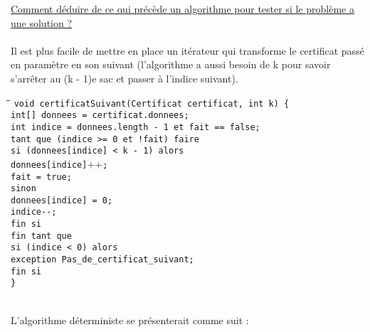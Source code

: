 \underline{Comment déduire de ce qui précède un algorithme pour tester si le problème a une solution ?}
~\\~\\
Il est plus facile de mettre en place un itérateur qui transforme le certificat passé en paramètre en son suivant (l'algorithme a aussi besoin de k pour savoir s'arrêter au (k - 1)e sac et passer
		à l'indice suivant).
\begin{tabbing}
	\hspace{1cm}\=\hspace{1cm}\=\hspace{1cm}\=\kill
	\verb+void certificatSuivant(Certificat certificat, int k) {+\\
		\>\verb+int[] donnees = certificat.donnees;+\\
		\>\verb+int indice = donnees.length - 1 et fait == false;+\\
		\>\verb+tant que (indice >= 0 et !fait) faire+\\
			\>\>\verb+si (donnees[indice] < k - 1) alors+\\
				\>\>\>\verb+donnees[indice]+++\verb+;+\\
				\>\>\>\verb+fait = true;+\\
			\>\>\verb+sinon+\\
				\>\>\>\verb+donnees[indice] = 0;+\\
				\>\>\>\verb+indice--;+\\
			\>\>\verb+fin si+\\
		\>\verb+fin tant que+\\
		\>\verb+si (indice < 0) alors+\\
			\>\>\verb+exception Pas_de_certificat_suivant;+\\
		\>\verb+fin si+\\
	\verb+}+
\end{tabbing}
~\\
L'algorithme déterministe se présenterait comme suit :
